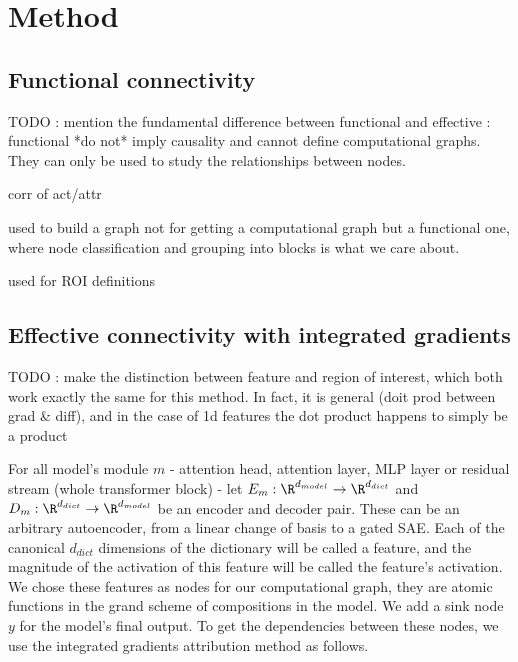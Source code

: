 \documentclass{article}
\begin{document}
\section{Method}

\subsection{Functional connectivity}

TODO : mention the fundamental difference between functional and effective : functional *do not* imply causality and cannot define computational graphs. They can only be used to study the relationships between nodes.

corr of act/attr

used to build a graph not for getting a computational graph but a functional one, where node classification and grouping into blocks is what we care about.

used for ROI definitions

\subsection{Effective connectivity with integrated gradients}

TODO : make the distinction between feature and region of interest, which both work exactly the same for this method. In fact, it is general (doit prod between grad & diff), and in the case of 1d features the dot product happens to simply be a product

For all model's module $m$ - attention head, attention layer, MLP layer or residual stream (whole transformer block) - let $E_m : \R^{d_{model}} \rightarrow \R^{d_{dict}}$ and $D_m : \R^{d_{dict}} \rightarrow \R^{d_{model}}$ be an encoder and decoder pair. These can be an arbitrary autoencoder, from a linear change of basis to a gated SAE. Each of the canonical $d_{dict}$ dimensions of the dictionary will be called a feature, and the magnitude of the activation of this feature will be called the feature's activation. We chose these features as nodes for our computational graph, they are atomic functions in the grand scheme of compositions in the model. %
We add a sink node $y$ for the model's final output. To get the dependencies between these nodes, we use the integrated gradients attribution method as follows.
\end{document}
